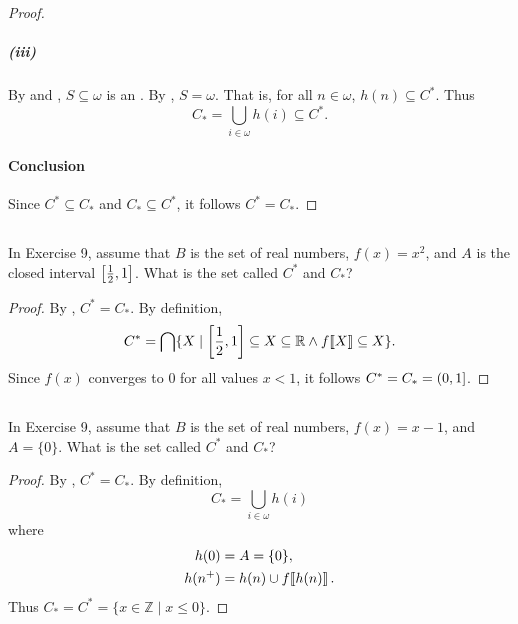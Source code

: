 \documentclass{report}
\begin{document}
\begin{proof}
    \subparagraph{(iii)}%

      By  and ,
        $S \subseteq \omega$ is an .
      By , $S = \omega$.
      That is, for all $n \in \omega$, $h(n) \subseteq C^*$.
      Thus $$C_* = \bigcup_{i \in \omega} h(i) \subseteq C^*.$$

  \paragraph{Conclusion}%

    Since $C^* \subseteq C_*$ and $C_* \subseteq C^*$, it follows $C^* = C_*$.

\end{proof}

\subsection{}%

In Exercise 9, assume that $B$ is the set of real numbers, $f(x) = x^2$, and $A$
  is the closed interval $\left[\frac{1}{2}, 1\right]$.
What is the set called $C^*$ and $C_*$?

\begin{proof}

  By , $C^* = C_*$.
  By definition,
    $$C^* = \bigcap \{X \mid
      \left[\frac{1}{2}, 1\right] \subseteq X \subseteq \mathbb{R} \land
      f\!\left\llbracket X\right\rrbracket \subseteq X\}.$$
  Since $f(x)$ converges to $0$ for all values $x < 1$, it follows
    $C^* = C_* = \left(0, 1\right]$.

\end{proof}

\subsection{}%

In Exercise 9, assume that $B$ is the set of real numbers, $f(x) = x - 1$, and
  $A = \{0\}$.
What is the set called $C^*$ and $C_*$?

\begin{proof}

  By , $C^* = C_*$.
  By definition, $$C_* = \bigcup_{i \in \omega} h(i)$$ where
    \begin{align*}
      h(0) & = A = \{0\}, \\
      h(n^+) & = h(n) \cup f\!\left\llbracket h(n)\right\rrbracket.
    \end{align*}
  Thus $C_* = C^* = \{x \in \mathbb{Z} \mid x \leq 0\}$.

\end{proof}
\end{document}
